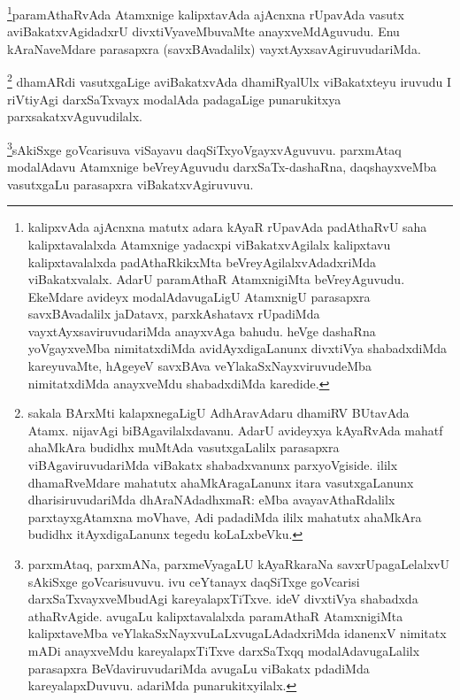 \begin{artha}
\footnote{kalipxvAda ajAcnxna matutx adara kAyaR rUpavAda padAthaRvU saha kalipxtavalalxda Atamxnige yadacxpi viBakatxvAgilalx kalipxtavu kalipxtavalalxda padAthaRkikxMta beVreyAgilalxvAdadxriMda viBakatxvalalx. AdarU paramAthaR AtamxnigiMta beVreyAguvudu. EkeMdare avideyx modalAdavugaLigU AtamxnigU parasapxra savxBAvadalilx jaDatavx, parxkAshatavx rUpadiMda vayxtAyxsaviruvudariMda anayxvAga bahudu. heVge dashaRna yoVgayxveMba nimitatxdiMda avidAyxdigaLanunx divxtiVya shabadxdiMda kareyuvaMte, hAgeyeV savxBAva veYlakaSxNayxviruvudeMba nimitatxdiMda anayxveMdu shabadxdiMda karedide.}paramAthaRvAda Atamxnige kalipxtavAda ajAcnxna rUpavAda vasutx aviBakatxvAgidadxrU divxtiVyaveMbuvaMte anayxveMdAguvudu. Enu kAraNaveMdare parasapxra (savxBAvadalilx) vayxtAyxsavAgiruvudariMda.
\end{artha}


\begin{artha}
\footnote{sakala BArxMti kalapxnegaLigU AdhAravAdaru dhamiRV BUtavAda Atamx. nijavAgi biBAgavilalxdavanu. AdarU avideyxya kAyaRvAda mahatf ahaMkAra budidhx muMtAda vasutxgaLalilx parasapxra viBAgaviruvudariMda viBakatx shabadxvanunx parxyoVgiside. ililx dhamaRveMdare mahatutx ahaMkAragaLanunx itara vasutxgaLanunx dharisiruvudariMda dhAraNAdadhxmaR: eMba avayavAthaRdalilx parxtayxgAtamxna moVhave, Adi padadiMda ililx mahatutx ahaMkAra budidhx itAyxdigaLanunx tegedu koLaLxbeVku.}
dhamARdi vasutxgaLige aviBakatxvAda dhamiRyalUlx viBakatxteyu iruvudu I riVtiyAgi darxSaTxvayx modalAda padagaLige punarukitxya parxsakatxvAguvudilalx.
\end{artha}


\begin{artha}
\footnote{parxmAtaq, parxmANa, parxmeVyagaLU kAyaRkaraNa savxrUpagaLelalxvU sAkiSxge goVcarisuvuvu. ivu ceYtanayx daqSiTxge goVcarisi darxSaTxvayxveMbudAgi kareyalapxTiTxve. ideV divxtiVya shabadxda athaRvAgide. avugaLu kalipxtavalalxda paramAthaR AtamxnigiMta kalipxtaveMba veYlakaSxNayxvuLaLxvugaLAdadxriMda idanenxV nimitatx mADi anayxveMdu kareyalapxTiTxve darxSaTxqq modalAdavugaLalilx parasapxra BeVdaviruvudariMda avugaLu viBakatx pdadiMda kareyalapxDuvuvu. adariMda punarukitxyilalx.}sAkiSxge goVcarisuva viSayavu daqSiTxyoVgayxvAguvuvu. parxmAtaq modalAdavu Atamxnige beVreyAguvudu darxSaTx-dashaRna, daqshayxveMba vasutxgaLu parasapxra viBakatxvAgiruvuvu.
\end{artha}

